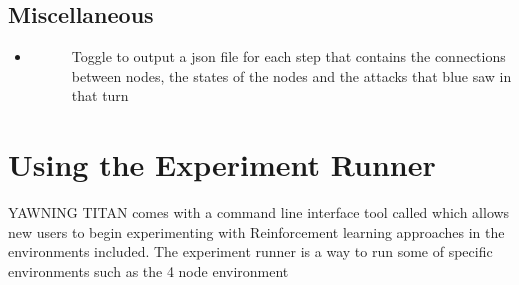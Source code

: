 \documentclass[letterpaper,10pt,english]{sphinxmanual}
\begin{document}
\section{Miscellaneous}
\label{\detokenize{source/config_file:miscellaneous}}\begin{itemize}
\item {} \begin{description}
\item[{}] \leavevmode
\sphinxAtStartPar
Toggle to output a json file for each step that contains the connections between nodes, the states of the nodes and the attacks that blue saw in that turn

\end{description}

\end{itemize}


\chapter{Using the Experiment Runner}
\label{\detokenize{source/quick_start_experiment_runner:using-the-experiment-runner}}\label{\detokenize{source/quick_start_experiment_runner::doc}}
\sphinxAtStartPar
YAWNING TITAN comes with a command line interface tool called  which allows new users to begin experimenting with Reinforcement learning approaches in the environments
included. The experiment runner is a way to run some of specific environments such as the 4 node environment
\end{document}
